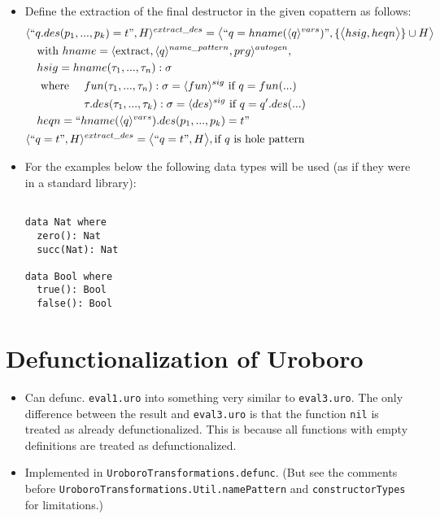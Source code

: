\documentclass[11pt]{article} %
\begin{document}
\begin{itemize}
\item Define the extraction of the final destructor in the given copattern as follows:
\begin{alignat*}{2}
& \langle `` q.des(p_1, ..., p_k) = t ", H \rangle^{extract\_des} = \big\langle `` q = hname(\langle q \rangle^{vars})  ", \{ \big\langle hsig, heqn \big\rangle \} \cup H \big\rangle \span\span \\
&\quad \textrm{with } hname = \langle \textrm{extract}, \langle q \rangle^{name\_pattern}, prg \rangle^{autogen}, \span\span \\
&\quad hsig = hname(\tau_1, ..., \tau_n): \sigma \span\span \\
&\quad \textrm{ where } && fun(\tau_1, ..., \tau_n): \sigma = \langle fun \rangle^{sig} \textrm{ if } q = fun(...)\\
&\quad && \tau.des(\tau_1, ..., \tau_k) : \sigma = \langle des \rangle^{sig} \textrm{ if } q = q'.des(...) \\
&\quad heqn = `` hname(\langle q \rangle^{vars}).des(p_1, ..., p_k) = t  " \span\span \\
& \langle `` q = t ", H \rangle^{extract\_des} = \big\langle `` q = t ", H \big\rangle, \textrm{if $q$ is hole pattern} \span\span
\end{alignat*}

\item For the examples below the following data types will be used (as if they were in a standard library):
\begin{lstlisting}

data Nat where
  zero(): Nat
  succ(Nat): Nat

data Bool where
  true(): Bool
  false(): Bool

\end{lstlisting}

\end{itemize}

\section{Defunctionalization of Uroboro}

\begin{itemize}
\item Can defunc. \texttt{eval1.uro} into something very similar to \texttt{eval3.uro}. The only difference between the result and \texttt{eval3.uro} is that the function \texttt{nil} is treated as already defunctionalized. This is because all functions with empty definitions are treated as defunctionalized.

\item Implemented in \texttt{UroboroTransformations.defunc}. (But see the comments before \texttt{UroboroTransformations.Util.namePattern} and \texttt{constructorTypes} for limitations.)

\end{itemize}
\end{document}
